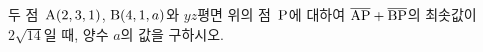 두 점~$\mathrm{A}(2{,}\mkern3mu\mathopen{}3{,}\mkern3mu\mathopen{}1)$, $\mathrm{B}(4{,}\mkern3mu\mathopen{}1{,}\mkern3mu\mathopen{}a)$와 $yz$평면 위의 점~$\mathrm{P}$에 대하여 $\overline{\mathrm{AP}}+\overline{\mathrm{BP}}$의 최솟값이 $2\sqrt{14}$일 때, 양수 $a$의 값을 구하시오.
